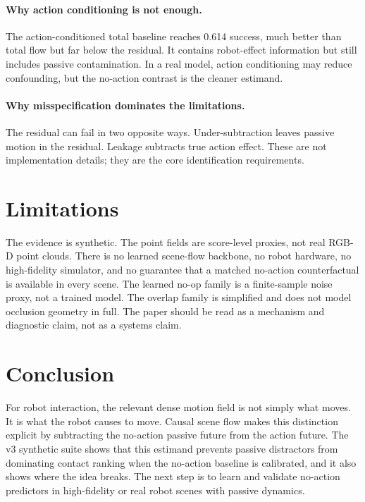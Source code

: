\documentclass{article}
\begin{document}
\paragraph{Why action conditioning is not enough.}
The action-conditioned total baseline reaches 0.614 success, much better than total flow
but far below the residual.  It contains robot-effect information but still includes
passive contamination.  In a real model, action conditioning may reduce confounding, but
the no-action contrast is the cleaner estimand.

\paragraph{Why misspecification dominates the limitations.}
The residual can fail in two opposite ways.  Under-subtraction leaves passive motion in
the residual.  Leakage subtracts true action effect.  These are not implementation
details; they are the core identification requirements.

\section{Limitations}

The evidence is synthetic.  The point fields are score-level proxies, not real RGB-D
point clouds.  There is no learned scene-flow backbone, no robot hardware, no
high-fidelity simulator, and no guarantee that a matched no-action counterfactual is
available in every scene.  The learned no-op family is a finite-sample noise proxy, not a
trained model.  The overlap family is simplified and does not model occlusion geometry in
full.  The paper should be read as a mechanism and diagnostic claim, not as a systems
claim.

\section{Conclusion}

For robot interaction, the relevant dense motion field is not simply what moves.  It is
what the robot causes to move.  Causal scene flow makes this distinction explicit by
subtracting the no-action passive future from the action future.  The v3 synthetic suite
shows that this estimand prevents passive distractors from dominating contact ranking
when the no-action baseline is calibrated, and it also shows where the idea breaks.  The
next step is to learn and validate no-action predictors in high-fidelity or real robot
scenes with passive dynamics.
\end{document}
